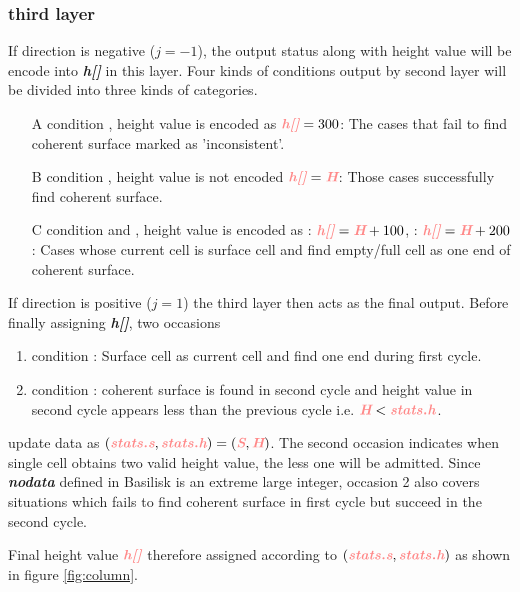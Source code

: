 \documentclass[a4paper]{article}
\newcommand{\para}[1]{\textbf{\emph{\textcolor{para}{#1}}}}
\begin{document}
\subsubsection{third layer}\label{sec:thirdl}
If direction is negative ($j=-1$), the output status along with height value will be encode into \para{h[]} in this layer. Four kinds of conditions output by second layer will be divided into three kinds of categories.
\begin{itemize}
    \item[A] condition , height value is encoded as $\para{h[]}=300$: The cases that fail to find coherent surface marked as 'inconsistent'.
    \item[B] condition , height value is not encoded $\para{h[]}=\para{H}$: Those cases successfully find coherent surface.
    \item[C] condition  and , height value is encoded as : $\para{h[]}=\para{H}+100$, : $\para{h[]}=\para{H}+200$: Cases whose current cell is surface cell and find empty/full cell as one end of coherent surface.
\end{itemize}
If direction is positive ($j=1$) the third layer then acts as the final output. Before finally assigning \para{h[]}, two occasions 
\begin{enumerate}
    \item condition : Surface cell as current cell and find one end during first cycle.
    \item condition : coherent surface is found in second cycle and height value in second cycle appears less than the previous cycle i.e. $\para{H}<\para{stats.h}$.
\end{enumerate}
update data as $(\para{stats.s},\para{stats.h})=(\para{S},\para{H})$. The second occasion indicates when single cell obtains two valid height value, the less one will be admitted. 
Since \para{nodata} defined in Basilisk is an extreme large integer, occasion 2 also covers situations which fails to find coherent surface in first cycle but succeed in the second cycle.\par
Final height value $\para{h[]}$ therefore assigned according to $(\para{stats.s},\para{stats.h})$ as shown in figure \ref{fig:column}.
\end{document}
